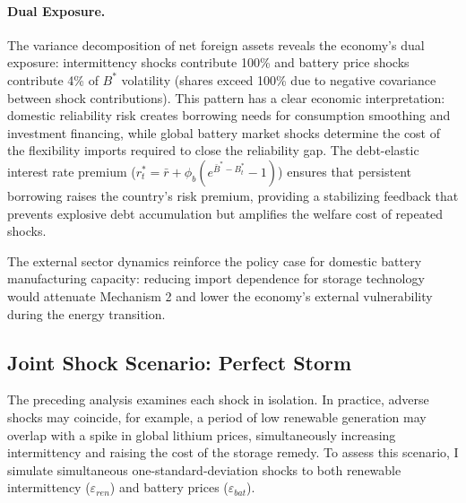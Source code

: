 \documentclass[12pt, a4paper]{article}
\begin{document}
	\paragraph{Dual Exposure.} The variance decomposition of net foreign assets reveals the economy's dual exposure: intermittency shocks contribute 100\% and battery price shocks contribute 4\% of $B^*$ volatility (shares exceed 100\% due to negative covariance between shock contributions). This pattern has a clear economic interpretation: domestic reliability risk creates borrowing needs for consumption smoothing and investment financing, while global battery market shocks determine the cost of the flexibility imports required to close the reliability gap. The debt-elastic interest rate premium ($r^*_t = \bar{r} + \phi_b(e^{\bar{B}^* - B^*_t} - 1)$) ensures that persistent borrowing raises the country's risk premium, providing a stabilizing feedback that prevents explosive debt accumulation but amplifies the welfare cost of repeated shocks.

	The external sector dynamics reinforce the policy case for domestic battery manufacturing capacity: reducing import dependence for storage technology would attenuate Mechanism 2 and lower the economy's external vulnerability during the energy transition.

	\subsection{Joint Shock Scenario: Perfect Storm} \label{subsec:joint_shock}

	The preceding analysis examines each shock in isolation. In practice, adverse shocks may coincide, for example, a period of low renewable generation may overlap with a spike in global lithium prices, simultaneously increasing intermittency and raising the cost of the storage remedy. To assess this scenario, I simulate simultaneous one-standard-deviation shocks to both renewable intermittency ($\varepsilon_{ren}$) and battery prices ($\varepsilon_{bat}$).
\end{document}
